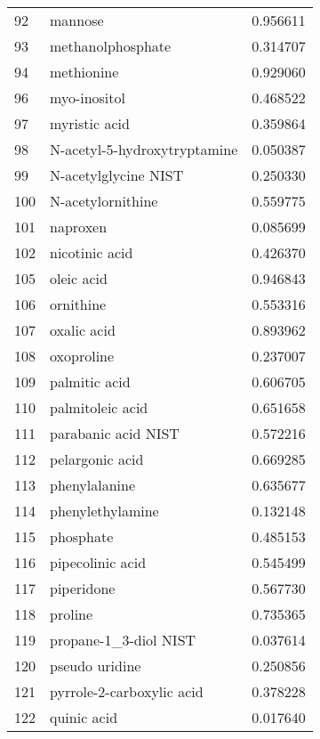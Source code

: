 \begin{tabular}{llr}
92  &                            mannose &  0.956611 \\
93  &                  methanolphosphate &  0.314707 \\
94  &                         methionine &  0.929060 \\
96  &                       myo-inositol &  0.468522 \\
97  &                      myristic acid &  0.359864 \\
98  &       N-acetyl-5-hydroxytryptamine &  0.050387 \\
99  &               N-acetylglycine NIST &  0.250330 \\
100 &                  N-acetylornithine &  0.559775 \\
101 &                           naproxen &  0.085699 \\
102 &                     nicotinic acid &  0.426370 \\
105 &                         oleic acid &  0.946843 \\
106 &                          ornithine &  0.553316 \\
107 &                        oxalic acid &  0.893962 \\
108 &                         oxoproline &  0.237007 \\
109 &                      palmitic acid &  0.606705 \\
110 &                   palmitoleic acid &  0.651658 \\
111 &                parabanic acid NIST &  0.572216 \\
112 &                    pelargonic acid &  0.669285 \\
113 &                      phenylalanine &  0.635677 \\
114 &                   phenylethylamine &  0.132148 \\
115 &                          phosphate &  0.485153 \\
116 &                   pipecolinic acid &  0.545499 \\
117 &                         piperidone &  0.567730 \\
118 &                            proline &  0.735365 \\
119 &              propane-1\_3-diol NIST &  0.037614 \\
120 &                     pseudo uridine &  0.250856 \\
121 &          pyrrole-2-carboxylic acid &  0.378228 \\
122 &                        quinic acid &  0.017640 \\

\end{tabular}
